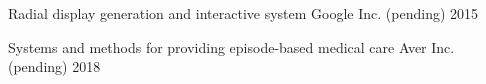 

\begin{cvhonors}

  \cvhonor
    {Radial display generation and interactive system}
    {Google Inc. (pending)}
    {} %
    {2015} %

  \cvhonor
    {Systems and methods for providing episode-based medical care}
    {Aver Inc. (pending)}
    {} %
    {2018} %

\end{cvhonors}
